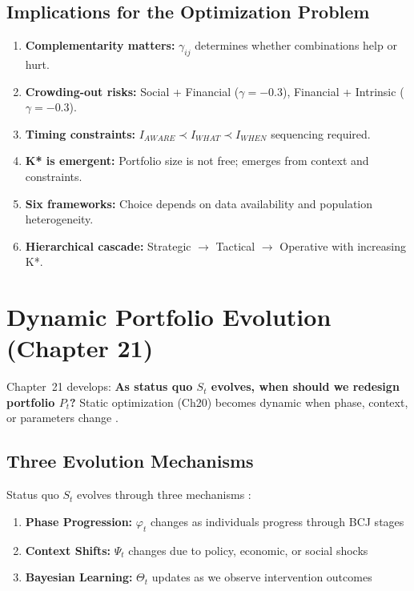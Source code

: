 \subsection{Implications for the Optimization Problem}

\begin{enumerate}[nosep]
\item \textbf{Complementarity matters:} $\gamma_{ij}$ determines whether combinations help or hurt.
\item \textbf{Crowding-out risks:} Social + Financial ($\gamma = -0.3$), Financial + Intrinsic ($\gamma = -0.3$).
\item \textbf{Timing constraints:} $I_{AWARE} \prec I_{WHAT} \prec I_{WHEN}$ sequencing required.
\item \textbf{K* is emergent:} Portfolio size is not free; emerges from context and constraints.
\item \textbf{Six frameworks:} Choice depends on data availability and population heterogeneity.
\item \textbf{Hierarchical cascade:} Strategic $\to$ Tactical $\to$ Operative with increasing K*.
\end{enumerate}

\section{Dynamic Portfolio Evolution (Chapter 21)}
\label{sec:mp-dynamic}

Chapter~21 develops: \textbf{As status quo $S_t$ evolves, when should we redesign portfolio $P_t$?} Static optimization (Ch20) becomes dynamic when phase, context, or parameters change \citep{prochaska1992stages, norcross2011stages, milkman2011harnessing}.

\subsection{Three Evolution Mechanisms}

Status quo $S_t$ evolves through three mechanisms \citep{ajzen1991theory, webb2006meta}:

\begin{enumerate}[nosep]
\item \textbf{Phase Progression:} $\varphi_t$ changes as individuals progress through BCJ stages
\item \textbf{Context Shifts:} $\Psi_t$ changes due to policy, economic, or social shocks
\item \textbf{Bayesian Learning:} $\Theta_t$ updates as we observe intervention outcomes
\end{enumerate}

